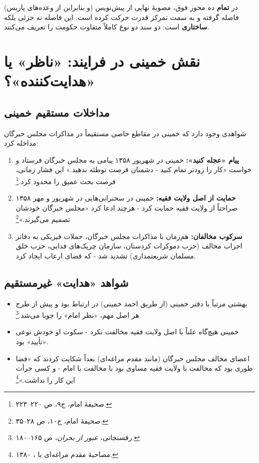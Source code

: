 \documentclass[12pt,a4paper]{book}
\newcommand{\keyword}[1]{\textbf{\textcolor{cPrimary}{#1}}}
\newcommand{\en}[1]{\lr{\textit{#1}}}
\begin{document}
\begin{warningBox}
در \keyword{تمام} ده محور فوق، مصوبهٔ نهایی از پیش‌نویس (و بنابراین از وعده‌های پاریس) فاصله گرفته و به سمت تمرکز قدرت حرکت کرده است. این فاصله نه جزئی بلکه \keyword{ساختاری} است: دو سند دو نوع کاملاً متفاوت حکومت را تعریف می‌کنند.
\end{warningBox}

\section{نقش خمینی در فرایند: «ناظر» یا «هدایت‌کننده»؟}

\subsection{مداخلات مستقیم خمینی}

شواهدی وجود دارد که خمینی در مقاطع خاصی مستقیماً در مذاکرات مجلس خبرگان مداخله کرد:

\begin{enumerate}[label=\textcolor{cPrimary}{\bfseries\arabic*.}, rightmargin=2em]
    \item \textbf{پیام «عجله کنید»:} خمینی در شهریور ۱۳۵۸ پیامی به مجلس خبرگان فرستاد و خواست «کار را زودتر تمام کنید - دشمنان فرصت توطئه ندهید.» این فشار زمانی، فرصت بحث عمیق را محدود کرد.\footnote{صحیفهٔ امام، ج۹، ص ۲۲۰–۲۲۳.}
    
    \item \textbf{حمایت از اصل ولایت فقیه:} خمینی در سخنرانی‌هایی در شهریور و مهر ۱۳۵۸ صراحتاً از ولایت فقیه حمایت کرد - هرچند ادعا کرد «مجلس خبرگان خودشان تصمیم می‌گیرند.»\footnote{صحیفهٔ امام، ج۱۰، ص ۲۸–۳۵.}
    
    \item \textbf{سرکوب مخالفان:} هم‌زمان با مذاکرات مجلس خبرگان، حملات فیزیکی به دفاتر احزاب مخالف (حزب دموکرات کردستان، سازمان چریک‌های فدایی، حزب خلق مسلمان شریعتمداری) تشدید شد - که فضای ارعاب ایجاد کرد.
\end{enumerate}

\subsection{شواهد «هدایت» غیرمستقیم}

\begin{itemize}[label=\textcolor{cConsolid}{$\blacktriangleright$}, rightmargin=2em]
    \item بهشتی مرتباً با دفتر خمینی (از طریق احمد خمینی) در ارتباط بود و پیش از طرح هر اصل مهم، «نظر امام» را جویا می‌شد.\footnote{رفسنجانی، \textit{عبور از بحران}، ص ۱۶۵–۱۸۰.}
    \item خمینی هیچ‌گاه علناً با اصل ولایت فقیه مخالفت نکرد - سکوت او خودش نوعی «تأیید» بود.
    \item اعضای مخالف مجلس خبرگان (مانند مقدم مراغه‌ای) بعداً شکایت کردند که «فضا طوری بود که مخالفت با ولایت فقیه مساوی بود با مخالفت با امام - و کسی جرأت این کار را نداشت.»\footnote{مصاحبهٔ مقدم مراغه‌ای با \en{BBC Persian}، ۱۳۸۰.}
\end{itemize}
\end{document}
